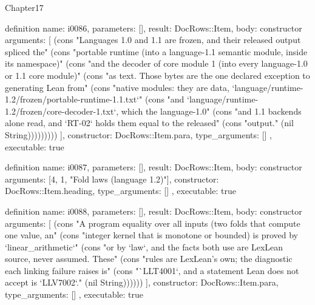 \begin{lexlean}{Chapter17}
\begin{semanticmodule}
definition{
  name: i0086,
  parameters: [],
  result: DocRows::Item,
  body: constructor{
    arguments: [
      (cons "Languages 1.0 and 1.1 are frozen, and their released output spliced the" (cons "portable runtime (into a language-1.1 semantic module, inside its namespace)" (cons "and the decoder of core module 1 (into every language-1.0 or 1.1 core module)" (cons "as text. Those bytes are the one declared exception to generating Lean from" (cons "native modules: they are data, `language/runtime-1.2/frozen/portable-runtime-1.1.txt`" (cons "and `language/runtime-1.2/frozen/core-decoder-1.txt`, which the language-1.0" (cons "and 1.1 backends alone read, and `RT-02` holds them equal to the released" (cons "output." (nil String)))))))))
    ],
    constructor: DocRows::Item.para,
    type_arguments: []
  },
  executable: true
}

definition{
  name: i0087,
  parameters: [],
  result: DocRows::Item,
  body: constructor{
    arguments: [4, 1, "Fold laws (language 1.2)"],
    constructor: DocRows::Item.heading,
    type_arguments: []
  },
  executable: true
}

definition{
  name: i0088,
  parameters: [],
  result: DocRows::Item,
  body: constructor{
    arguments: [
      (cons "A program equality over all inputs (two folds that compute one value, an" (cons "integer kernel that is monotone or bounded) is proved by `linear_arithmetic`" (cons "or by `law`, and the facts both use are LexLean source, never assumed. These" (cons "rules are LexLean's own; the diagnostic each linking failure raises is" (cons "`LLT4001`, and a statement Lean does not accept is `LLV7002`." (nil String))))))
    ],
    constructor: DocRows::Item.para,
    type_arguments: []
  },
  executable: true
}


\end{semanticmodule}
\end{lexlean}
